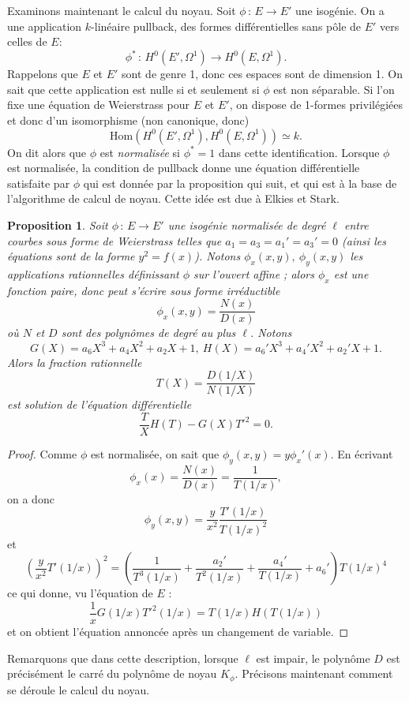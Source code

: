 \documentclass[11pt,a4paper]{article}
\newcommand{\vers}{\longrightarrow}
\newcommand{\Hom}{\mathrm{Hom}}
\newcommand{\de}{\,:\,}
\renewcommand{\v}{\vspace{5mm}}
\newtheorem*{prop}{Proposition}
\theoremstyle{definition}
\begin{document}
\v
Examinons maintenant le calcul du noyau. Soit $\phi\de E\vers E'$ une isogénie. On a une application $k$-linéaire \og pullback\fg, des formes différentielles sans pôle de $E'$ vers celles de $E$:
$$\phi^*\de H^0(E', \Omega^1)\vers H^0(E, \Omega^1).$$
Rappelons que $E$ et $E'$ sont de genre 1, donc ces espaces sont de dimension 1. On sait que cette application est nulle si et seulement si $\phi$ est non séparable. Si l'on fixe une équation de Weierstrass pour $E$ et $E'$, on dispose de 1-formes privilégiées et donc d'un isomorphisme (non canonique, donc)
$$\Hom(H^0(E', \Omega^1), H^0(E, \Omega^1))\simeq k.$$
On dit alors que $\phi$ est \emph{normalisée} si $\phi^* = 1$ dans cette identification. Lorsque $\phi$ est normalisée, la condition de pullback donne une équation différentielle satisfaite par $\phi$ qui est donnée par la proposition qui suit, et qui est à la base de l'algorithme de calcul de noyau. Cette idée est due à Elkies et Stark.

\begin{prop}
Soit $\phi\de E\vers E'$ une isogénie normalisée de degré $\ell$ entre courbes sous forme de Weierstrass telles que $a_1 = a_3 = a_1' = a_3' = 0$ (ainsi les équations sont de la forme $y^2 = f(x)$). Notons $\phi_x(x,y),\ \phi_y(x,y)$ les applications rationnelles définissant $\phi$ sur l'ouvert affine ; alors $\phi_x$ est une fonction paire, donc peut s'écrire sous forme irréductible
$$\phi_x(x, y) = \frac{N(x)}{D(x)}$$
où $N$ et $D$ sont des polynômes de degré au plus $\ell$. Notons
$$G(X) = a_6 X^3 + a_4 X^2 + a_2 X + 1,\ H(X) =a_6' X^3 + a_4' X^2 + a_2' X + 1.$$
Alors la fraction rationnelle 
$$T(X) = \frac{D(1/X)}{N(1/X)}$$
est solution de l'équation différentielle
$$\frac{T}{X} H(T) - G(X) T'^2 = 0.$$
\end{prop}

\begin{proof}
Comme $\phi$ est normalisée, on sait que $\phi_y (x, y) = y \phi_x'(x).$ En écrivant 
$$\phi_x(x) = \frac{N(x)}{D(x)} = \frac{1}{T(1/x)},$$
on a donc
$$\phi_y(x, y) = \frac{y}{x^2} \frac{T'(1/x)}{T(1/x)^2}$$
et
$$ \left(\frac{y}{x^2} T'(1/x)\right)^2 = \left(\frac{1}{T^3(1/x)} + \frac{a_2'}{T^2(1/x)} + \frac{a_4'}{T(1/x)} + a_6'\right)T(1/x)^4$$
ce qui donne, vu l'équation de $E$ :
$$ \frac{1}{x} G(1/x) T'^2(1/x) =T(1/x) H(T(1/x))$$
et on obtient l'équation annoncée après un changement de variable.
\end{proof}
\v

Remarquons que dans cette description, lorsque $\ell$ est impair, le polynôme $D$ est précisément le carré du polynôme de noyau $K_\phi$. Précisons maintenant comment se déroule le calcul du noyau.
\end{document}
